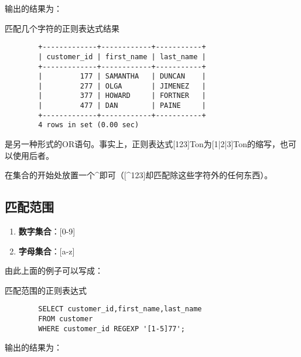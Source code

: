 \documentclass[UTF8]{article}
\begin{document}
输出的结果为：

\begin{listing}[H]
	\caption{匹配几个字符的正则表达式结果}
	\label{code:mulmatchzhengzeresult}
\begin{verbatim}
        +-------------+------------+-----------+
        | customer_id | first_name | last_name |
        +-------------+------------+-----------+
        |         177 | SAMANTHA   | DUNCAN    |
        |         277 | OLGA       | JIMENEZ   |
        |         377 | HOWARD     | FORTNER   |
        |         477 | DAN        | PAINE     |
        +-------------+------------+-----------+
        4 rows in set (0.00 sec)
\end{verbatim}
\end{listing}

\begin{orangebox}[frametitle={Tips 9.3.1 |与[ ]的对比}]
        [ ]是另一种形式的OR语句。事实上，正则表达式[123]Ton为[1|2|3]Ton的缩写，也可以使用后者。
\end{orangebox}


\begin{orangebox}[frametitle={Tips 9.3.2 否定字符集}]
        在集合的开始处放置一个\^{}即可（[\^{}123]却匹配除这些字符外的任何东西）。
\end{orangebox}

\subsection{匹配范围}

\begin{orangebox}[frametitle={Tips 9.4.1 匹配范围}]
\begin{enumerate}
        \item \textbf{数字集合}：[0-9]
        \item \textbf{字母集合}：[a-z]
\end{enumerate}
\end{orangebox}
由此上面的例子可以写成：

\begin{listing}[H]
	\caption{匹配范围的正则表达式}
	\label{code:rangematchzhengze}
\begin{verbatim}
        SELECT customer_id,first_name,last_name 
        FROM customer 
        WHERE customer_id REGEXP '[1-5]77';
\end{verbatim}
\end{listing}

输出的结果为：
\end{document}
